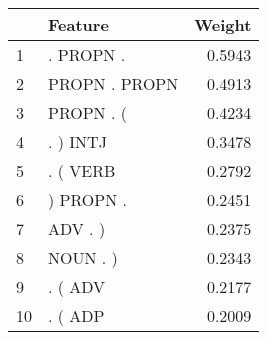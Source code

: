 \begin{tabular}{llr}
\toprule
{} &        Feature &  Weight \\
\midrule
1  &      . PROPN . &  0.5943 \\
2  &  PROPN . PROPN &  0.4913 \\
3  &      PROPN . ( &  0.4234 \\
4  &       . ) INTJ &  0.3478 \\
5  &       . ( VERB &  0.2792 \\
6  &      ) PROPN . &  0.2451 \\
7  &        ADV . ) &  0.2375 \\
8  &       NOUN . ) &  0.2343 \\
9  &        . ( ADV &  0.2177 \\
10 &        . ( ADP &  0.2009 \\
\bottomrule
\end{tabular}
